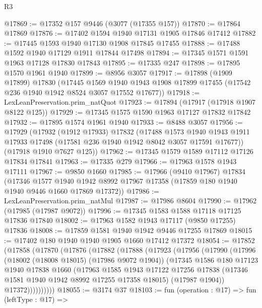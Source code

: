 \begin{lexlean}{R3}
\begin{coremodule}
@17869 := @17352 @157 @9446 (@3077 (@17355 @157))
@17870 := @17864 @17869
@17876 := @17402 @1594 @1940 @17131 @1905 @17846 @17412
@17882 := @17445 @1593 @1940 @17130 @1908 @17845 @17455
@17888 := @17488 @1592 @1940 @17129 @1911 @17844 @17498
@17894 := @17345 @1571 @1591 @1963 @17128 @17830 @17843
@17895 := @17335 @247
@17898 := @17895 @1570 @1961 @1940
@17899 := @8956 @3057
@17917 := @17898
    (@1909 @17899)
    @17830
    (@17445
      @1569
      @1940
      @1943
      @1908
      @17899
      @17455
      (@17542 @236 @1940 @1942 @8524 @3057 @17552 @17677))
@17918 := LexLeanPreservation.prim_natQuot
@17923 := @17894 (@17917 (@17918 @1907 @8122 @125))
@17929 := @17345 @1575 @1590 @1963 @17127 @17832 @17842
@17932 := @17895 @1574 @1961 @1940
@17933 := @8488 @3057
@17956 := @17929
    (@17932
      (@1912 @17933)
      @17832
      (@17488
        @1573
        @1940
        @1943
        @1911
        @17933
        @17498
        (@17581 @236 @1940 @1942 @8042 @3057 @17591 @17677))
      (@17918 @1910 @7627 @125))
@17962 := @17345 @1579 @1589 @17112 @17126 @17834 @17841
@17963 := @17335 @279
@17966 := @17963 @1578 @1943 @17111
@17967 := @9850 @1660
@17985 := @17966
    (@9410 @17967)
    @17834
    (@17346
      @1577
      @1940
      @1942
      @8992
      @17967
      @17358
      (@17859 @180 @1940 @1940 @9446 @1660 @17869 @17372))
@17986 := LexLeanPreservation.prim_natMul
@17987 := @17986 @8604
@17990 := @17962 (@17985 (@17987 @9072))
@17996 := @17345 @1583 @1588 @17118 @17125 @17836 @17840
@18002 := @17963 @1582 @1943 @17117 (@9850 @17255) @17836
@18008 := @17859 @1581 @1940 @1942 @9446 @17255 @17869
@18015 := @17402 @180 @1940 @1940 @1905 @1660 @17412 @17372
@18054 := @17852
    (@17858
      (@17870
        (@17876
          (@17882
            (@17888
              (@17923
                (@17956
                  (@17990
                    (@17996
                      (@18002 (@18008 @18015) (@17986 @9072 @1904))
                      (@17345
                        @1586
                        @180
                        @17123
                        @1940
                        @17838
                        @1660
                        (@17963
                          @1585
                          @1943
                          @17122
                          @17256
                          @17838
                          (@17346 @1581 @1940 @1942 @8992 @17255 @17358 @18015)
                          (@17987 @1904))
                        @17372))))))))))
@18055 := @3174 @37
@18103 := fun (operation : @17) =>
  fun (leftType : @17) =>

\end{coremodule}
\end{lexlean}
